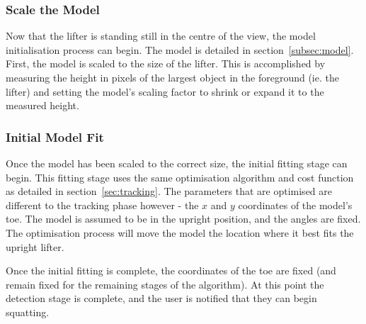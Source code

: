 \subsubsection{Scale the Model}
Now that the lifter is standing still in the centre of the view, the model initialisation process can begin. The model is detailed in section~\ref{subsec:model}. First, the model is scaled to the size of the lifter. This is accomplished by measuring the height in pixels of the largest object in the foreground (ie. the lifter) and setting the model's scaling factor to shrink or expand it to the measured height.

\subsubsection{Initial Model Fit}
Once the model has been scaled to the correct size, the initial fitting stage can begin. This fitting stage uses the same optimisation algorithm and cost function as detailed in section~\ref{sec:tracking}. The parameters that are optimised are different to the tracking phase however - the $x$ and $y$ coordinates of the model's toe. The model is assumed to be in the upright position, and the angles are fixed. The optimisation process will move the model the location where it best fits the upright lifter.

Once the initial fitting is complete, the coordinates of the toe are fixed (and remain fixed for the remaining stages of the algorithm). At this point the detection stage is complete, and the user is notified that they can begin squatting.